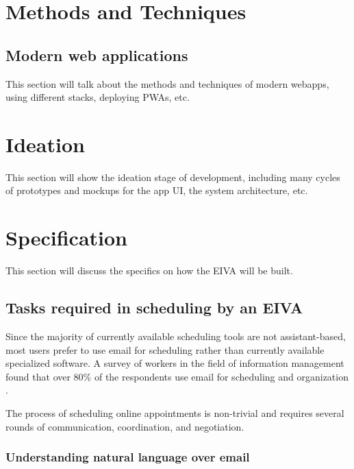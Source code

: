 \documentclass{article}
\begin{document}
\newpage

\section{Methods and Techniques}

\subsection{Modern web applications}

This section will talk about the methods and techniques of modern webapps, using different stacks, deploying PWAs, etc.

\newpage

\section{Ideation}

This section will show the ideation stage of development, including many cycles of prototypes and mockups for the app UI, the system architecture, etc.

\newpage

\section{Specification}

This section will discuss the specifics on how the EIVA will be built.

\subsection{Tasks required in scheduling by an EIVA}

Since the majority of currently available scheduling tools are not assistant-based, most users prefer to use email for scheduling rather than currently available specialized software. A survey of workers in the field of information management found that over 80\% of the respondents use email for scheduling and organization \cite{ducheneaut_e-mail_2001}.

The process of scheduling online appointments is non-trivial and requires several rounds of communication, coordination, and negotiation.

\subsubsection{Understanding natural language over email}
\end{document}
